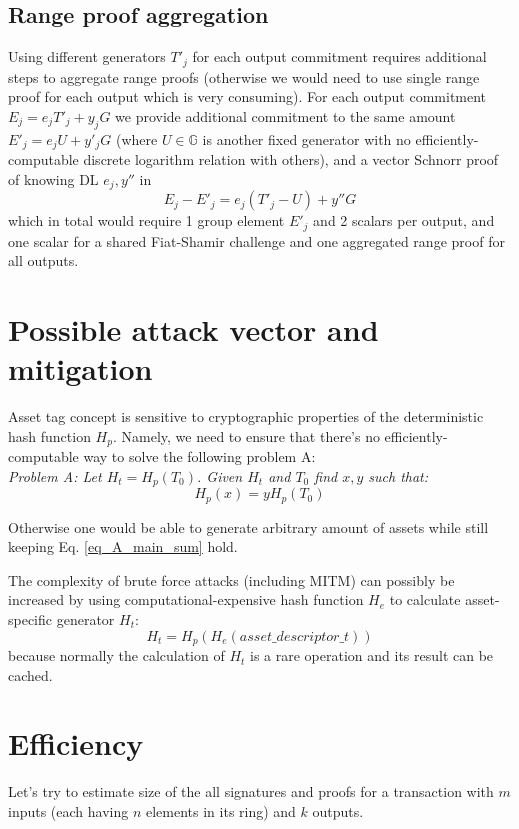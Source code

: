 \documentclass{article}
\begin{document}
\subsection{Range proof aggregation}
Using different generators $T'_j$ for each output commitment requires additional steps to aggregate range proofs (otherwise we would need to use single range proof for each output which is very consuming). For each output commitment $E_j = e_j T'_j + y_j G$ we provide additional commitment to the same amount $E'_j = e_jU + y'_jG$ (where $U \in \mathbb{G}$ is another fixed generator with no efficiently-computable discrete logarithm relation with others), and a vector Schnorr proof of knowing DL $e_j, y''$ in
\[ E_j - E'_j = e_j (T'_j - U) + y'' G\] which in total would require 1 group element $E'_j$ and 2 scalars per output, and one scalar for a shared Fiat-Shamir challenge and one aggregated range proof for all outputs.


\section{Possible attack vector and mitigation}
Asset tag concept is sensitive to cryptographic properties of the deterministic hash function $H_p$. Namely, we need to ensure that there's no efficiently-computable way to solve the following problem A:\\

\textit{Problem A: Let $H_t = H_p(T_0)$. Given $H_t$ and $T_0$ find $x, y$ such that:
\[ H_p(x) = y H_p(T_0) \] }

Otherwise one would be able to generate arbitrary amount of assets while still keeping Eq. \ref{eq_A_main_sum} hold.

The complexity of brute force attacks (including MITM) can possibly be increased by using computational-expensive hash function $H_e$ to calculate asset-specific generator $H_t$:
\[ H_t = H_p(H_e(\textit{asset\_descriptor\_t}))\]
because normally the calculation of $H_t$ is a rare operation and its result can be cached. 

\section{Efficiency}

Let's try to estimate size of the all signatures and proofs for a transaction with $m$ inputs (each having $n$ elements in its ring) and $k$ outputs.
\end{document}
